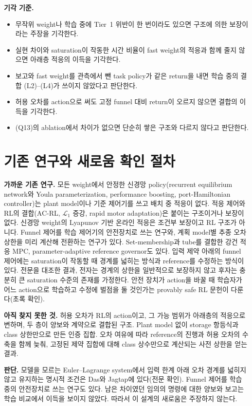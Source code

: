 \documentclass[11pt]{article}\usepackage[margin=1in]{geometry}\usepackage{amsmath,amssymb,amsthm,mathtools}\usepackage{graphicx}\graphicspath{{figures/}{../figures/}{figs/}{./}}\usepackage{enumitem}\usepackage{hyperref}\usepackage{cleveref}\usepackage{tikz}\usetikzlibrary{arrows.meta,positioning,calc,shapes.geometric}\usepackage{float}\usepackage{rotating}\usepackage[most]{tcolorbox}\usepackage{kotex}\usepackage{booktabs}\emergencystretch=1.6em\tolerance=2000 \crefname{assumption}{Assumption}{Assumptions}\Crefname{assumption}{Assumption}{Assumptions}\crefname{definition}{Definition}{Definitions}\Crefname{definition}{Definition}{Definitions}\crefname{proposition}{Proposition}{Propositions}\Crefname{proposition}{Proposition}{Propositions}\crefname{fact}{Fact}{Facts}\Crefname{fact}{Fact}{Facts} \newtheorem{assumption}{Assumption}\newtheorem{definition}{Definition}\newtheorem{lemma}{Lemma}\newtheorem{proposition}{Proposition}\newtheorem{theorem}{Theorem}\newtheorem{corollary}{Corollary}\newtheorem{fact}{Fact}\theoremstyle{remark}\newtheorem{remark}{Remark} \newcommand{\R}{\mathbb{R}}\newcommand{\xb}{\bar x}\newcommand{\Ab}{\bar A}\newcommand{\By}{\bar B_y}\newcommand{\U}{\mathcal U}\newcommand{\Z}{\mathcal Z}
\begin{document}
\textbf{기각 기준.}
\begin{itemize}
\item 무작위 weight나 학습 중에 Tier~1 위반이 한 번이라도 있으면 구조에 의한 보장이라는 주장을 기각한다.
\item 실현 차이와 saturation이 작동한 시간 비율이 fast weight의 적응과 함께 줄지 않으면 아래층 적응의 이득을 기각한다.
\item 보고와 fast weight를 관측에서 뺀 task policy가 같은 return을 내면 학습 중의 결합 (L2)--(L4)가 쓰이지 않았다고 판단한다.
\item 허용 오차를 action으로 써도 고정 funnel 대비 return이 오르지 않으면 결합의 이득을 기각한다.
\item (Q13)의 ablation에서 차이가 없으면 단순히 쌓은 구조와 다르지 않다고 판단한다.
\end{itemize}

\section{기존 연구와 새로움 확인 절차}
\label{sec:novelty}

\textbf{가까운 기존 연구.} 모든 weight에서 안정한 신경망 policy(recurrent equilibrium network와 Youla parameterization, performance boosting, port-Hamiltonian controller)는 plant model이나 기준 제어기를 쓰고 배치 중 적응이 없다. 적응 제어와 RL의 결합(AC-RL, $\mathcal L_1$ 증강, rapid motor adaptation)은 붙이는 구조이거나 보장이 없다. 신경망 weight의 Lyapunov 기반 온라인 적응은 조건부 보장이고 RL 구조가 아니다. Funnel 제어를 학습 제어기의 안전장치로 쓰는 연구와, 계획 model별 추종 오차 상한을 미리 계산해 전환하는 연구가 있다. Set-membership과 tube를 결합한 강건 적응 MPC, parameter-adaptive reference governor도 있다. 입력 제약 아래의 funnel 제어에는 saturation이 작동할 때 경계를 넓히는 방식과 reference를 수정하는 방식이 있다. 전문을 대조한 결과, 전자는 경계의 상한을 일반적으로 보장하지 않고 후자는 충분히 큰 saturation 수준의 존재를 가정한다. 안전 장치가 action을 바꿀 때 학습자가 어느 action으로 학습하고 수정에 벌점을 둘 것인가는 provably safe RL 문헌이 다룬다(초록 확인).

\textbf{아직 찾지 못한 것.} 허용 오차가 RL의 action이고, 그 가능 범위가 아래층의 적응으로 변하며, 두 층이 양보와 계약으로 결합된 구조. Plant model 없이 storage 항등식과 class 상한만으로 만든 인증 집합. 오차 여유에 따라 reference의 진행과 허용 오차의 수축을 함께 늦춰, 고정된 제약 집합에 대해 class 상수만으로 계산되는 사전 상한을 얻는 결과.

\textbf{판단.} 모델을 모르는 Euler--Lagrange system에서 입력 한계 아래 오차 경계를 넓히지 않고 유지하는 명시적 조건은 Das와 Jagtap에 있다(전문 확인). Funnel 제어를 학습 중의 안전장치로 쓰는 연구도 있다. 남은 차이였던 임의의 명령에 대한 양보와 보고는 학습 비교에서 이득을 보이지 않았다. 따라서 이 설계의 새로움은 주장하지 않는다.
\end{document}
